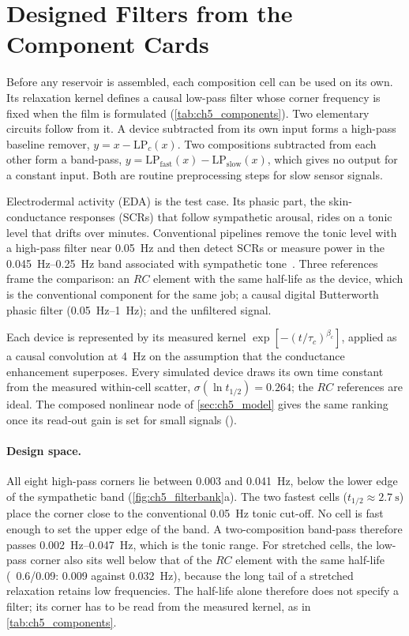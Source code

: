 \documentclass[12pt, twoside]{report}
\begin{document}
\section{Designed Filters from the Component Cards}\label{sec:ch5_filters}

Before any reservoir is assembled, each composition cell can be used on its own. Its relaxation kernel defines a causal low-pass filter whose corner frequency is fixed when the film is formulated (\cref{tab:ch5_components}). Two elementary circuits follow from it. A device subtracted from its own input forms a high-pass baseline remover, \(y=x-\mathrm{LP}_c(x)\). Two compositions subtracted from each other form a band-pass, \(y=\mathrm{LP}_{\mathrm{fast}}(x)-\mathrm{LP}_{\mathrm{slow}}(x)\), which gives no output for a constant input. Both are routine preprocessing steps for slow sensor signals.

Electrodermal activity (EDA) is the test case. Its phasic part, the skin-conductance responses (SCRs) that follow sympathetic arousal, rides on a tonic level that drifts over minutes. Conventional pipelines remove the tonic level with a high-pass filter near \SI{0.05}{\hertz} and then detect SCRs or measure power in the \SIrange{0.045}{0.25}{\hertz} band associated with sympathetic tone~\cite{PosadaQuintero2016EDASymp}. Three references frame the comparison: an $RC$ element with the same half-life as the device, which is the conventional component for the same job; a causal digital Butterworth phasic filter (\SIrange{0.05}{1}{\hertz}); and the unfiltered signal.

Each device is represented by its measured kernel \(\exp[-(t/\tau_c)^{\beta_c}]\), applied as a causal convolution at \SI{4}{\hertz} on the assumption that the conductance enhancement superposes. Every simulated device draws its own time constant from the measured within-cell scatter, \(\sigma(\ln t_{1/2})=\num{0.264}\); the $RC$ references are ideal. The composed nonlinear node of \cref{sec:ch5_model} gives the same ranking once its read-out gain is set for small signals ().

\paragraph{Design space.} All eight high-pass corners lie between \num{0.003} and \SI{0.041}{\hertz}, below the lower edge of the sympathetic band (\cref{fig:ch5_filterbank}a). The two fastest cells (\(t_{1/2}\approx\SI{2.7}{\second}\)) place the corner close to the conventional \SI{0.05}{\hertz} tonic cut-off. No cell is fast enough to set the upper edge of the band. A two-composition band-pass therefore passes \SIrange{0.002}{0.047}{\hertz}, which is the tonic range. For stretched cells, the low-pass corner also sits well below that of the $RC$ element with the same half-life (\PEO{}~0.6/0.09: \num{0.009} against \SI{0.032}{\hertz}), because the long tail of a stretched relaxation retains low frequencies. The half-life alone therefore does not specify a filter; its corner has to be read from the measured kernel, as in \cref{tab:ch5_components}.
\end{document}
